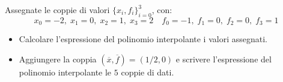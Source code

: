 Assegnate le coppie di valori $\{x_i,f_i \}_{i=0}^3$, con:
\[
x_0=-2, \; x_1=0, \; x_2=1,\; x_3=2 \quad f_0=-1, \; f_1=0, \;
f_2=0,\; f_3=1
\]
\begin{itemize}
\item  Calcolare l'espressione del polinomio interpolante i
valori assegnati.
\item
Aggiungere la coppia $(\overline{x},\overline{f})=(1/2,0)$ e
scrivere l'espressione del polinomio interpolante le $5$ coppie di
dati.

\end{itemize}
